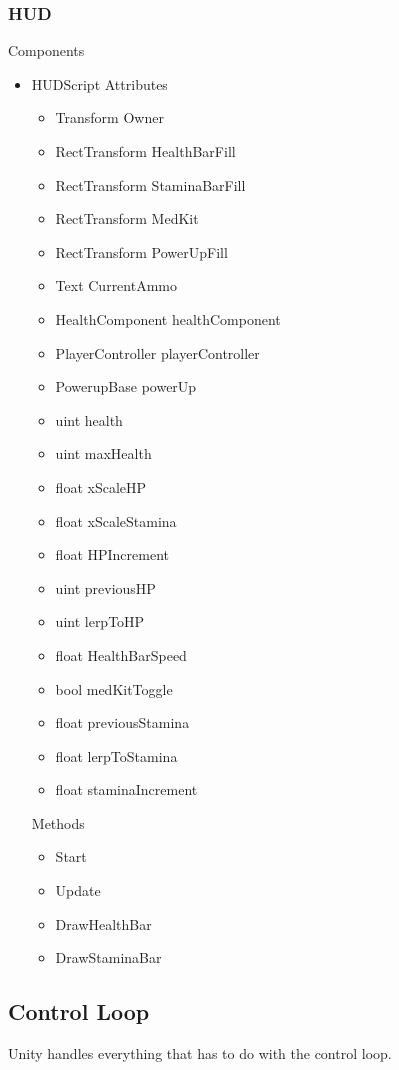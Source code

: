 \documentclass[11pt]{article}
\begin{document}
\subsubsection{HUD}
Components
\begin{itemize}
	\item HUDScript
	\newline Attributes
	\begin{itemize}
		\item Transform Owner
		\item RectTransform HealthBarFill
		\item RectTransform StaminaBarFill
		\item RectTransform MedKit
		\item RectTransform PowerUpFill
		\item Text CurrentAmmo
		\item HealthComponent healthComponent
		\item PlayerController playerController
		\item PowerupBase powerUp
		\item uint health
		\item uint maxHealth
		\item float xScaleHP
		\item float xScaleStamina
		\item float HPIncrement
		\item uint previousHP
		\item uint lerpToHP
		\item float HealthBarSpeed
		\item bool medKitToggle
		\item float previousStamina
		\item float lerpToStamina
		\item float staminaIncrement
	\end{itemize}
	Methods
	\begin{itemize}
		\item Start
		\item Update
		\item DrawHealthBar
		\item DrawStaminaBar
	\end{itemize}
\end{itemize}

\subsection{Control Loop}
Unity handles everything that has to do with the control loop.
\end{document}
